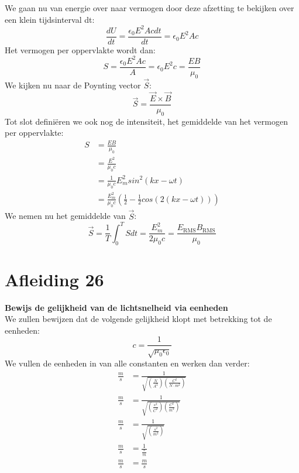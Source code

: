 \documentclass[a4paper,kul]{kulakarticle} %
\begin{document}
We gaan nu van energie over naar vermogen door deze afzetting te bekijken over een klein tijdsinterval dt:
\begin{equation*}
	\frac{dU}{dt}=\frac{\epsilon_0E^2Acdt}{dt}= \epsilon_0E^2Ac
\end{equation*}
Het vermogen per oppervlakte wordt dan:
\begin{equation*}
	S = \frac{\epsilon_0E^2Ac}{A} = \epsilon_0E^2c = \frac{EB}{\mu_0}
\end{equation*}
We kijken nu naar de Poynting vector $\vec{S}$:
\begin{equation*}
	\vec{S} = \frac{\vec{E}\times\vec{B}}{\mu_0}
\end{equation*}
\newpage
Tot slot definiëren we ook nog de intensiteit, het gemiddelde van het vermogen per oppervlakte:
\begin{align*}
	S&= \frac{EB}{\mu_0}\\
	&= \frac{E^2}{\mu_0c}\\
	&= \frac{1}{\mu_0c}E^2_msin^2(kx-\omega t)\\
	&=\frac{E^2_m}{\mu_0c}(\frac{1}{2}-\frac{1}{2}cos(2(kx-\omega t)))
\end{align*} 
We nemen nu het gemiddelde van $\vec{S}$:
\begin{equation*}
	\vec{S}=\frac{1}{T}\int_{0}^{T}Sdt=\frac{E^2_m}{2\mu_0c}=\frac{E_{\text{RMS}}B_{\text{RMS}}}{\mu_0}
\end{equation*}
\newpage
\section{Afleiding 26}
\textbf{Bewijs de gelijkheid van de lichtsnelheid via eenheden}\\
We zullen bewijzen dat de volgende gelijkheid klopt met betrekking tot de eenheden:
\begin{equation*}
	c = \frac{1}{\sqrt{\mu_0\epsilon_0}}
\end{equation*}
We vullen de eenheden in van alle constanten en werken dan verder:
\begin{align*}
	\frac{m}{s} &= \frac{1}{\sqrt{(\frac{N}{A^2})(\frac{C^2}{N\cdot m^2})}}\\
	\frac{m}{s} &= \frac{1}{\sqrt{(\frac{s^2}{C^2})(\frac{C^2}{ m^2})}}\\
	\frac{m}{s} &= \frac{1}{\sqrt{(\frac{s^2}{m^2})}}\\
	\frac{m}{s} &= \frac{1}{\frac{s}{m}}\\
	\frac{m}{s} &= \frac{m}{s}	
\end{align*}
\newpage
\end{document}

